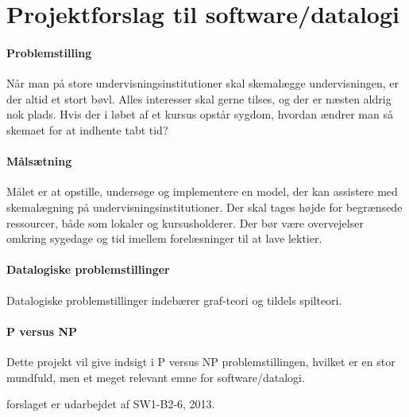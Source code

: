 


\section*{Projektforslag til software/datalogi}

\paragraph{Problemstilling}

Når man på store undervisningsinstitutioner skal skemalægge undervisningen, er der altid et stort bøvl. Alles interesser skal gerne tilses, og der er næsten aldrig nok plads. Hvis der i løbet af et kursus opstår sygdom, hvordan ændrer man så skemaet for at indhente tabt tid?

\paragraph{Målsætning}

Målet er at opstille, undersøge og implementere en model, der kan assistere med skemalægning på undervisningsinstitutioner. Der skal tages højde for begrænsede ressourcer, både som lokaler og kursusholderer. Der bør være overvejelser omkring sygedage og tid imellem forelæsninger til at lave lektier.

\paragraph{Datalogiske problemstillinger}

Datalogiske problemstillinger indebærer graf-teori og tildels spilteori.

\paragraph{P versus NP}

Dette projekt vil give indsigt i P versus NP problemstillingen, hvilket er en stor mundfuld, men et meget relevant emne for software/datalogi. 

forslaget er udarbejdet af SW1-B2-6, 2013.
